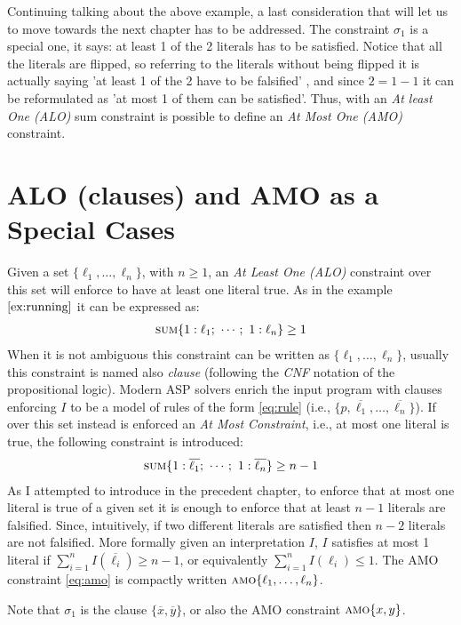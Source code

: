Continuing talking about the above example, a last consideration that will let us to move towards the next 
chapter has to be addressed.
The constraint $\sigma_1$ is a special one, it says: at least 1 of the 2 literals
has to be satisfied. Notice that all the literals are flipped, 
so referring to the literals without being flipped it is 
actually saying 'at least 1 of the 2 have to be falsified' , and since $2 = 1 - 1$ it can be 
reformulated as 'at most 1 of them can be satisfied'.
Thus, with an \textit{At least One (ALO)} sum constraint is possible to define an \textit{At Most One (AMO)}
constraint.

\section{ALO (clauses) and AMO as a Special Cases}
\label{sec:bg-clauses_AMO}

Given a set $\{\ell_1, \hdots, \ell_n\}$, with $n \ge 1$, an \textit{At Least One (ALO)} 
constraint over this set will enforce to have at least one literal true.
As in the example $\ref{ex:running}$ it can be expressed as:
\begin{align}\label{eq:ALO}
    \textsc{sum}\{1 : \ell_1;\ \cdots;\ 1 : \ell_n\} \geq 1
\end{align}
When it is not ambiguous this constraint can be written as $\{\ell_1, \hdots, \ell_n\}$,
usually this constraint is named also \textit{clause} (following the \textit{CNF} notation 
of the propositional logic).
Modern ASP solvers enrich the input program with clauses enforcing $I$ to be a 
model of rules of the form \eqref{eq:rule} (i.e., $\{p, \overline{\ell_1}, \ldots, \overline{\ell_n}\}$).
If over this set instead is enforced an \textit{At Most Constraint}, i.e., at most 
one literal is true, the following constraint is introduced:
\begin{align}\label{eq:amo}
    \textsc{sum}\{1 : \overline{\ell_1};\ \cdots;\ 1 : \overline{\ell_n}\} \geq n - 1
\end{align}
As I attempted to introduce in the precedent chapter, to enforce that at most
one literal is true of a given set it is enough to enforce that 
at least $n-1$ literals are falsified.
Since, intuitively, if two different literals are satisfied then $n-2$ literals are not falsified.
More formally given an interpretation $I$, $I$ satisfies at most 1 literal if 
$\sum_{i = 1}^{n}{I(\overline{\ell_i})} \geq n - 1$, or equivalently
$\sum_{i = 1}^{n}{I(\ell_i)} \leq 1$.
The AMO constraint \eqref{eq:amo} is compactly written $\textsc{amo}\{\ell_1,\ldots,\ell_n\}$.
\begin{example}
    Note that $\sigma_1$ is the clause $\{\overline{x}, \overline{y}\}$, or also the AMO constraint $\textsc{amo}\{x, y\}$.
\end{example}
